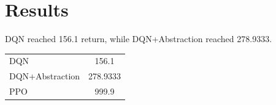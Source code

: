 \section{Results}
DQN reached 156.1 return, while DQN+Abstraction reached 278.9333.
\begin{table}[h]
\begin{tabular}{lc}
DQN & 156.1 \\
DQN+Abstraction & 278.9333 \\
PPO & 999.9 \\
\end{tabular}
\end{table}
